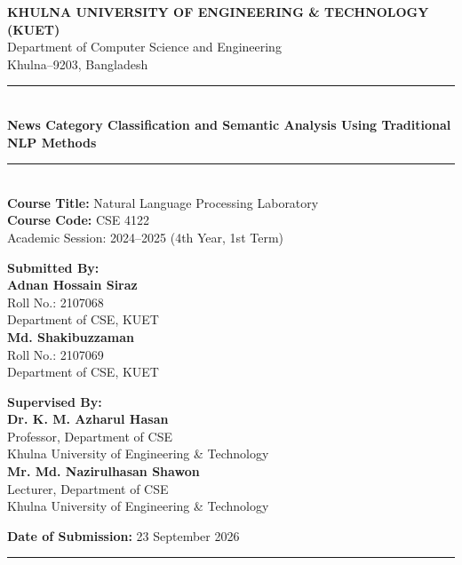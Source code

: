 \documentclass[11pt,a4paper]{article}
\begin{document}
	
	\begin{titlepage}
		\centering
		\vspace*{0.3cm}
		
		{\Large \textbf{KHULNA UNIVERSITY OF ENGINEERING \& TECHNOLOGY (KUET)}}\\[0.25cm]
		{\large Department of Computer Science and Engineering}\\[0.15cm]
		{\normalsize Khulna--9203, Bangladesh}\\[0.7cm]
		
		\rule{\linewidth}{1.2pt}\\[0.4cm]
		{\Large \bfseries \color{kuetblue} News Category Classification and Semantic Analysis Using Traditional NLP Methods}\\[0.3cm]
		\rule{\linewidth}{1.2pt}\\[0.6cm]
		
		{\large \textbf{Course Title:} Natural Language Processing Laboratory}\\[0.15cm]
		{\large \textbf{Course Code:} CSE 4122}\\[0.15cm]
		{\normalsize Academic Session: 2024--2025 (4th Year, 1st Term)}\\[1.0cm]
		
		\begin{minipage}[t]{0.48\textwidth}
			\flushleft
			\vspace{1.5cm}
			\textbf{\large Submitted By:}\\[0.2cm]
			\textbf{Adnan Hossain Siraz}\\
			Roll No.: 2107068\\
			Department of CSE, KUET\\[0.5cm]
			
			\textbf{Md. Shakibuzzaman}\\
			Roll No.: 2107069\\
			Department of CSE, KUET
		\end{minipage}
		\hfill
		\begin{minipage}[t]{0.48\textwidth}
			\flushright
			\vspace{1.5cm}
			\textbf{\large Supervised By:}\\[0.2cm]
			\textbf{Dr. K. M. Azharul Hasan}\\
			Professor, Department of CSE\\
			Khulna University of Engineering \& Technology\\[0.4cm]
			\textbf{Mr. Md. Nazirulhasan Shawon}\\
			Lecturer, Department of CSE\\
			Khulna University of Engineering \& Technology
		\end{minipage}
		
		\vfill
		{\large \textbf{Date of Submission:} 23 September 2026}\\[0.2cm]
		\rule{0.4\linewidth}{0.5pt}\\
		
	\end{titlepage}
	
\end{document}
